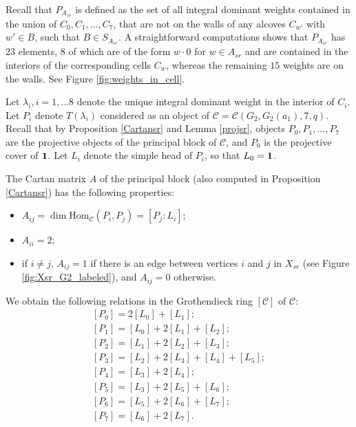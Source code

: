 \documentclass{amsart}
\theoremstyle{definition}
\newcommand{\C}{\mathcal{C}}
\newcommand{\Hom}{\mathrm{Hom}}
\newcommand{\be}{{\bf 1}}
\numberwithin{equation}{section}
\begin{document}
Recall that $P_{A_{sr}}$ is defined as the set of all integral dominant weights contained in the union of $C_0, C_1,\ldots, C_7$, that are not on the walls of any alcoves $C_{w'}$ with $w'\in B$, such that $B\in S_{A_{sr}}$.
A straightforward computations shows that $P_{A_{sr}}$ has $23$ elements, $8$ of which are of the form $w\cdot 0$ for $w\in A_{sr}$ and are contained in the interiors of the corresponding cells $C_w$, whereas the remaining $15$ weights are on the walls. See Figure \ref{fig:weights_in_cell}.

Let $\lambda_i, i=1,\ldots 8$ denote the unique integral dominant weight in the interior of $C_i$. Let $P_i$ denote $T(\lambda_i)$ considered as an object of $\C=\C(G_2,G_2(a_1), 7, q)$. Recall that by Proposition \ref{Cartansr} and Lemma \ref{projsr}, objects $P_0, P_1,\ldots, P_7$ are the projective objects of the principal block of $\C$, and $P_0$ is the projective cover of $\be$. Let $L_i$ denote the simple head of $P_i$, so that $L_0=\be$.

The Cartan matrix $A$ of the principal block (also computed in Proposition \ref{Cartansr}) has the following properties:
\begin{itemize}
    \item $A_{ij}=\dim\Hom_\C(P_i, P_j)=[P_j:L_i]$;
    \item $A_{ii}=2$;
    \item if $i\neq j$, $A_{ij}=1$ if there is an edge between vertices $i$ and $j$ in $X_{sr}$ (see Figure \ref{fig:Xsr_G2_labeled}), and $A_{ij}=0$ otherwise.
\end{itemize}

We obtain the following relations in the Grothendieck ring $[\C]$ of $\C$:
\begin{equation}
\label{eq:proj_and_simple}
\begin{aligned}
    [P_0]=2[L_0]+[L_1];\\
    [P_1]=[L_0]+2[L_1]+[L_2];\\
    [P_2]=[L_1]+2[L_2]+[L_3];\\
    [P_3]=[L_2]+2[L_3]+[L_4]+[L_5];\\
    [P_4]=[L_3]+2[L_4];\\
    [P_5]=[L_3]+2[L_5]+[L_6];\\
    [P_6]=[L_5]+2[L_6]+[L_7];\\
    [P_7]=[L_6]+2[L_7].
\end{aligned}    
\end{equation}
\end{document}
